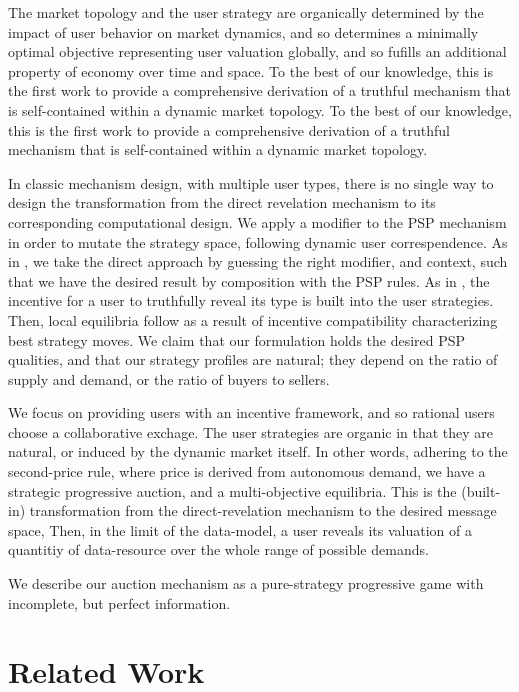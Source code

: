 The market
topology and the user strategy are organically determined by the impact of user
behavior on market dynamics, and so determines a minimally optimal objective
representing user valuation globally, and so fufills an additional property of
economy over time and space. To the best of our knowledge, this is the first
work to provide a comprehensive derivation of a truthful mechanism that is self-contained within a dynamic market
topology.
To the best of our knowledge, this is the first work to provide a comprehensive
derivation of a truthful mechanism that is self-contained within a dynamic market
topology. 

In classic mechanism design, with multiple user types, there is no single
way to design the transformation from the direct revelation mechanism to its
corresponding computational design. We apply a modifier to the PSP mechanism in
order to mutate the strategy space, following dynamic user
correspendence. As in \cite{lazar}, we take the direct
approach by guessing the right modifier, and context, such that we have the
desired result by composition with the PSP rules. 
As in \cite{lazar}, the incentive for a
user to truthfully reveal its type is built into the user strategies. Then,
local equilibria follow as a result of incentive
compatibility characterizing best strategy moves.
We claim that our formulation holds the desired PSP qualities,
and that our strategy profiles are natural; they depend on the ratio of
supply and demand, or the ratio of buyers to sellers.

We focus on providing users with an incentive framework, and
so rational users choose a collaborative exchage. 
The user strategies are organic in that they are natural, or
induced by the dynamic market itself. In other words, adhering to the second-price rule,
where price is derived from autonomous demand, we have a strategic
progressive auction, and a multi-objective equilibria.
This is the (built-in) transformation from the
direct-revelation mechanism to the desired message space, Then, in the limit of
the data-model, a user reveals its valuation of a quantitiy of data-resource over the whole range of possible demands.

We describe our auction mechanism as a
pure-strategy progressive game with incomplete, but perfect information.

\section{Related Work}

